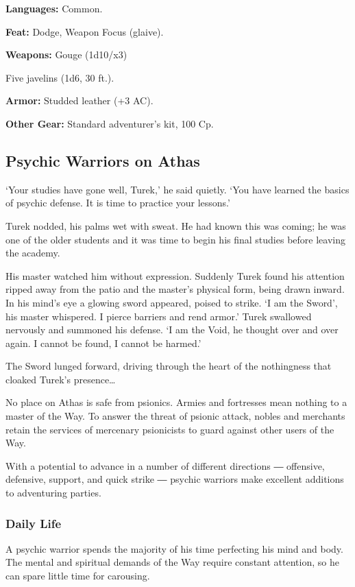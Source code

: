 \textbf{Languages:} Common.

\textbf{Feat:} Dodge, Weapon Focus (glaive).

\textbf{Weapons:} Gouge (1d10/x3)

Five javelins (1d6, 30 ft.).

\textbf{Armor:} Studded leather (+3 AC).

\textbf{Other Gear:} Standard adventurer’s kit, 100 Cp.

\subsection{Psychic Warriors on Athas}{‘Your studies have gone well, Turek,’ he said quietly. ‘You have learned the basics of psychic defense. It is time to practice your lessons.’

Turek nodded, his palms wet with sweat. He had known this was coming; he was one of the older students and it was time to begin his final studies before leaving the academy.

His master watched him without expression. Suddenly Turek found his attention ripped away from the patio and the master’s physical form, being drawn inward. In his mind’s eye a glowing sword appeared, poised to strike. ‘I am the Sword’, his master whispered. I pierce barriers and rend armor.’ Turek swallowed nervously and summoned his defense. ‘I am the Void, he thought over and over again. I cannot be found, I cannot be harmed.’

The Sword lunged forward, driving through the heart of the nothingness that cloaked Turek’s presence…}{}

No place on Athas is safe from psionics. Armies and fortresses mean nothing to a master of the Way. To answer the threat of psionic attack, nobles and merchants retain the services of mercenary psionicists to guard against other users of the Way.

With a potential to advance in a number of different directions ― offensive, defensive, support, and quick strike ― psychic warriors make excellent additions to adventuring parties.

\subsubsection{Daily Life}

A psychic warrior spends the majority of his time perfecting his mind and body. The mental and spiritual demands of the Way require constant attention, so he can spare little time for carousing.

